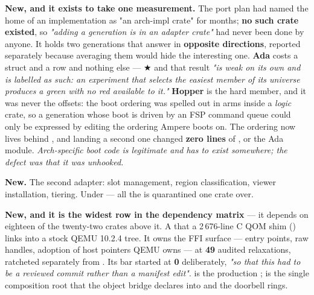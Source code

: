 \documentclass[10.5pt]{article}
\begin{document}
\textbf{New, and it exists to take one measurement.} The port plan had named the home of an
 implementation as "an arch-impl crate" for months; \textbf{no such crate existed}, so
\emph{"adding a generation is  in an adapter crate"} had never been
done by anyone. It holds two generations that answer in \textbf{opposite directions}, reported
separately because averaging them would hide the interesting one. \textbf{Ada} costs a struct and
a  row and nothing else — ★ and that result \emph{"is weak on its own and
is labelled as such: an experiment that selects the easiest member of its universe produces a
green with no red available to it."} \textbf{Hopper} is the hard member, and it was never the
offsets: the boot ordering was spelled out in  arms inside a \emph{logic} crate, so a
generation whose boot is driven by an FSP command queue could only be expressed by editing the
ordering Ampere boots on. The ordering now lives behind , and
landing a second one changed \textbf{zero lines} of ,  or
the Ada module. \emph{Arch-specific boot code is legitimate and has to exist somewhere; the
defect was that it was unhooked.}

\textbf{New.} The second  adapter: slot management, region classification, viewer
installation, tiering. Under  — all the  is quarantined
one crate over.

\textbf{New, and it is the widest row in the dependency matrix} — it depends on eighteen of the
twenty-two crates above it. A  that a 2\,676-line C QOM shim
() links into a stock QEMU 10.2.4 tree. It owns
the FFI surface —  entry points, raw  handles, adoption of
host pointers QEMU owns — at \textbf{49} audited  relaxations, ratcheted separately
from . Its bar started at \textbf{0} deliberately, \emph{"so that this
had to be a reviewed commit rather than a manifest edit"}.  is the production
;  is the single composition root that the object
bridge declares into and the doorbell rings.
\end{document}
